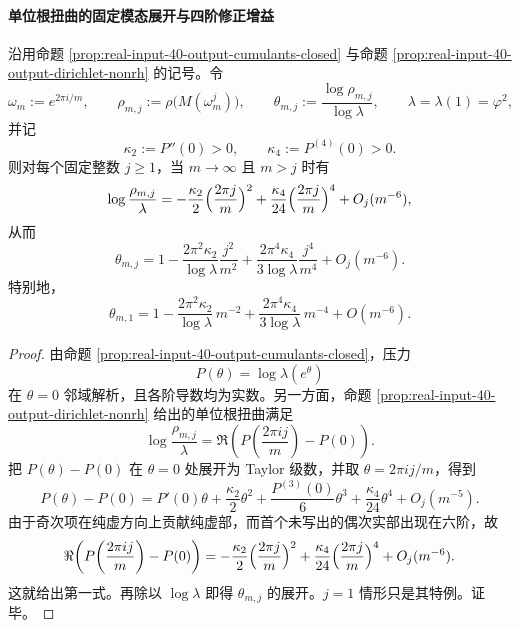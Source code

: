 \paragraph{单位根扭曲的固定模态展开与四阶修正增益}

\begin{theorem}[固定单位根模态误差指数的四阶展开]\label{thm:xi-output-potential-dirichlet-fixed-j-fourth-order}
沿用命题 \ref{prop:real-input-40-output-cumulants-closed} 与命题 \ref{prop:real-input-40-output-dirichlet-nonrh} 的记号。令
\[
\omega_m:=e^{2\pi i/m},
\qquad
\rho_{m,j}:=\rho\!\bigl(M(\omega_m^j)\bigr),
\qquad
\theta_{m,j}:=\frac{\log \rho_{m,j}}{\log \lambda},
\qquad
\lambda=\lambda(1)=\varphi^2,
\]
并记
\[
\kappa_2:=P''(0)>0,
\qquad
\kappa_4:=P^{(4)}(0)>0.
\]
则对每个固定整数 \(j\ge 1\)，当 \(m\to\infty\) 且 \(m>j\) 时有
\[
\log\frac{\rho_{m,j}}{\lambda}
=
-\frac{\kappa_2}{2}\Bigl(\frac{2\pi j}{m}\Bigr)^2
+\frac{\kappa_4}{24}\Bigl(\frac{2\pi j}{m}\Bigr)^4
+O_j(m^{-6}),
\]
从而
\[
\boxed{\;
\theta_{m,j}
=
1-\frac{2\pi^2\kappa_2}{\log\lambda}\frac{j^2}{m^2}
+\frac{2\pi^4\kappa_4}{3\log\lambda}\frac{j^4}{m^4}
+O_j(m^{-6}).\;}
\]
特别地，
\[
\boxed{\;
\theta_{m,1}
=
1-\frac{2\pi^2\kappa_2}{\log\lambda}\,m^{-2}
+\frac{2\pi^4\kappa_4}{3\log\lambda}\,m^{-4}
+O(m^{-6}).\;}
\]
\end{theorem}
\begin{proof}
由命题 \ref{prop:real-input-40-output-cumulants-closed}，压力
\[
P(\theta)=\log \lambda(e^\theta)
\]
在 \(\theta=0\) 邻域解析，且各阶导数均为实数。另一方面，命题 \ref{prop:real-input-40-output-dirichlet-nonrh} 给出的单位根扭曲满足
\[
\log\frac{\rho_{m,j}}{\lambda}
=
\Re\!\left(P\!\left(\frac{2\pi i j}{m}\right)-P(0)\right).
\]
把 \(P(\theta)-P(0)\) 在 \(\theta=0\) 处展开为 Taylor 级数，并取
\(
\theta=2\pi i j/m
\)，得到
\[
P(\theta)-P(0)
=
P'(0)\theta+\frac{\kappa_2}{2}\theta^2+\frac{P^{(3)}(0)}{6}\theta^3
+\frac{\kappa_4}{24}\theta^4+O_j(m^{-5}).
\]
由于奇次项在纯虚方向上贡献纯虚部，而首个未写出的偶次实部出现在六阶，故
\[
\Re\!\left(P\!\left(\frac{2\pi i j}{m}\right)-P(0)\right)
=
-\frac{\kappa_2}{2}\Bigl(\frac{2\pi j}{m}\Bigr)^2
+\frac{\kappa_4}{24}\Bigl(\frac{2\pi j}{m}\Bigr)^4
+O_j(m^{-6}).
\]
这就给出第一式。再除以 \(\log \lambda\) 即得 \(\theta_{m,j}\) 的展开。\(j=1\) 情形只是其特例。证毕。
\end{proof}

